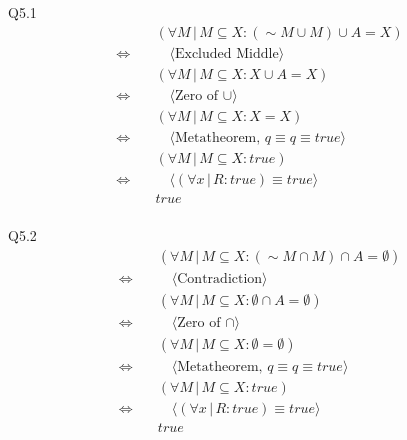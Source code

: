 \documentclass{article}
\begin{document}
    \vspace{10mm}
    Q5.1
    \begin{align*}
        & \quad (\forall M\, |\, M \subseteq X : (\sim M \cup M) \cup A = X) \\
        \Longleftrightarrow & \qquad \langle \text{Excluded Middle} \rangle \\
        & \quad (\forall M\, |\, M \subseteq X : X \cup A = X) \\
        \Longleftrightarrow & \qquad \langle \text{Zero of } \cup \rangle \\
        & \quad (\forall M\, |\, M \subseteq X : X = X) \\
        \Longleftrightarrow & \qquad \langle \text{Metatheorem, } q \equiv q \equiv true \rangle \\
        & \quad (\forall M\, |\, M \subseteq X : true) \\
        \Longleftrightarrow & \qquad \langle (\forall x\, |\, R : true) \equiv true \rangle \\
        & \quad true \\
    \end{align*}
  
    Q5.2
    \begin{align*}
        & \quad (\forall M\, |\, M \subseteq X : (\sim M \cap M) \cap A = \emptyset) \\
        \Longleftrightarrow & \qquad \langle \text{Contradiction} \rangle \\
        & \quad (\forall M\, |\, M \subseteq X : \emptyset \cap A = \emptyset) \\
        \Longleftrightarrow & \qquad \langle \text{Zero of } \cap \rangle \\
        & \quad (\forall M\, |\, M \subseteq X : \emptyset = \emptyset) \\
        \Longleftrightarrow & \qquad \langle \text{Metatheorem, } q \equiv q \equiv true \rangle \\
        & \quad (\forall M\, |\, M \subseteq X : true) \\
        \Longleftrightarrow & \qquad \langle (\forall x\, |\, R : true) \equiv true \rangle \\
        & \quad true \\
    \end{align*}
\end{document}

